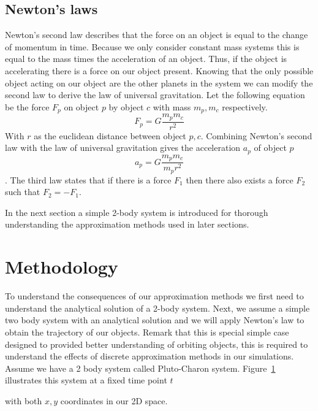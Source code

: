 \documentclass[11pt]{article} %
\begin{document}
\subsection{Newton's laws}
Newton's second law describes that the force on an object is equal to the change of momentum in time. Because we only consider constant mass systems this is equal to the mass times the acceleration of an object. Thus, if the object is accelerating there is a force on our object present. Knowing that the only possible object acting on our object are the other planets in the system we can modify the second law to derive the law of universal gravitation. Let the following equation be the force $F_p$ on object $p$ by object $c$ with mass $m_p,m_c$ respectively.   
\begin{equation}
    \label{eq:newtongravity}
 F_p = G\frac{m_pm_c}{r^2}
\end{equation}
With $r$ as the euclidean distance between object $p,c$. Combining Newton's second law with the law of universal gravitation gives the acceleration $a_p$ of object $p$
\begin{equation}
    \label{eq:newtongravity}
	a_p = G\frac{m_pm_c}{ m_pr^2}
\end{equation}.
The third law states that if there is a force $F_1$ then there also exists a force $F_2$ such that $F_2 = - F_1$. 

In the next section a simple 2-body system is introduced for thorough understanding the approximation methods used in later sections.


\section{Methodology}
\label{sec:methodology}
To understand the consequences of our approximation methods we first need to understand the analytical solution of a 2-body system. Next, we assume a simple two body system with an analytical solution and we will apply Newton's law to obtain the trajectory of our objects. Remark that this is special simple case designed to provided better understanding of orbiting objects, this is required to understand the effects of discrete approximation methods in our simulations. \\
\indent Assume we have a 2 body system called Pluto-Charon system. Figure~\ref{fig:plutocharon} illustrates this system at a fixed time point $t$
\begin{figure}
	\label{fig:plutocharon}
\end{figure}
with both $x,y$ coordinates in our 2D space.
\end{document}
